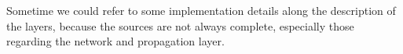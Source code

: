 Sometime we could refer to some implementation details along the description of 
the layers, because the sources are not always complete, especially those
regarding the network and propagation layer.











